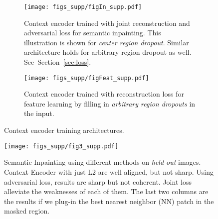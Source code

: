 \documentclass[10pt,twocolumn,letterpaper]{article}
\newcommand{\refsec}[1]{Section~\ref{sec:#1}}
\newcommand{\lblfig}[1]{\label{fig:#1}}
\begin{document}
\begin{figure*}[t]
\captionsetup[subfigure]{justification=centering}
  \begin{subfigure}[b]{\textwidth}
    \centering
    \texttt{[image: figs\_supp/figIn\_supp.pdf]}
    \caption{Context encoder trained with joint reconstruction and adversarial loss for semantic inpainting. This illustration is shown for \textit{center region dropout}. Similar architecture holds for arbitrary region dropout as well. See~\refsec{loss}.}
    \lblfig{arch_inpaint}
  \end{subfigure}

  \vspace{4em}
  \begin{subfigure}[b]{\textwidth}
    \centering
    \texttt{[image: figs\_supp/figFeat\_supp.pdf]}
    \caption{Context encoder trained with reconstruction loss for feature learning by filling in \textit{arbitrary region dropouts} in the input.}
    \lblfig{arch_feature}
  \end{subfigure}
  \vspace{2em}
  \caption{Context encoder training architectures.}
  \lblfig{arch}
\end{figure*}

\begin{figure*}[t]
\centering
\texttt{[image: figs\_supp/fig3\_supp.pdf]}
\caption{Semantic Inpainting using different methods on \textit{held-out} images.
Context Encoder with just L2 are well aligned, but not sharp. Using adversarial loss, results are sharp but not coherent. Joint loss alleviate the weaknesses of each of them.
The last two columns are the results if we plug-in the best nearest neighbor (NN) patch in the masked region.
}
\lblfig{inpaint_supp}
\end{figure*}
\end{document}
